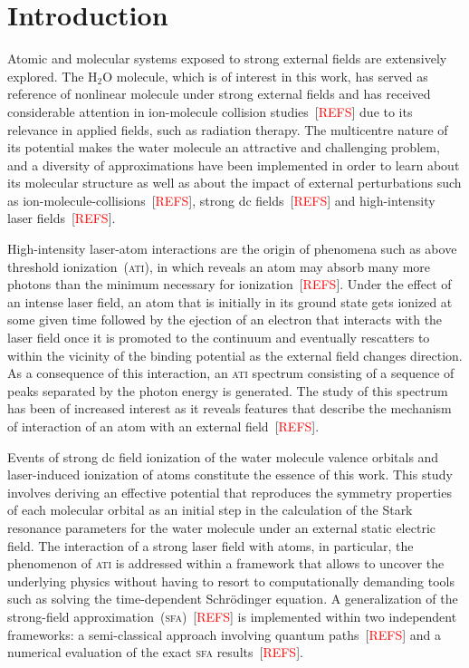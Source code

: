 \chapter{Introduction}
\label{cha:introduction}


Atomic and molecular systems exposed to strong external fields are
extensively explored. The H$_{2}$O molecule, which is of interest in
this work, has served as reference of nonlinear molecule under strong
external fields and has received considerable attention in
ion-molecule collision studies~[\textcolor{red}{REFS}] due to its
relevance in applied fields, such as radiation therapy.  The
multicentre nature of its potential makes the water molecule an
attractive and challenging problem, and a diversity of approximations
have been implemented in order to learn about its molecular structure
as well as about the impact of external perturbations such as
ion-molecule-collisions~[\textcolor{red}{REFS}], strong dc
fields~[\textcolor{red}{REFS}] and high-intensity laser
fields~[\textcolor{red}{REFS}].

High-intensity laser-atom interactions are the origin of phenomena
such as above threshold ionization~(\textsc{ati}), in which reveals an
atom may absorb many more photons than the minimum necessary for
ionization~[\textcolor{red}{REFS}].
Under the effect of an intense laser field, an atom that is initially
in its ground state gets ionized at some given time followed by the
ejection of an electron that interacts with the laser field once it is
promoted to the continuum and eventually rescatters to within the
vicinity of the binding potential as the external field changes
direction. As a consequence of this interaction, an \textsc{ati}
spectrum consisting of a sequence of peaks separated by the photon
energy is generated. The study of this spectrum has been of increased
interest as it reveals features that describe the mechanism of
interaction of an atom with an external field~[\textcolor{red}{REFS}].

Events of strong dc field ionization of the water molecule valence
orbitals and laser-induced ionization of atoms constitute the essence
of this work. This study involves deriving an effective potential that
reproduces the symmetry properties of each molecular orbital as an
initial step in the calculation of the Stark resonance parameters for
the water molecule under an external static electric field.
The interaction of a strong laser field with atoms, in particular, the
phenomenon of \textsc{ati} is addressed within a framework that allows
to uncover the underlying physics without having to resort to
computationally demanding tools such as solving the time-dependent
Schr\"{o}dinger equation. A generalization of the strong-field
approximation~(\textsc{sfa})~[\textcolor{red}{REFS}] is implemented
within two independent frameworks: a semi-classical approach involving
quantum paths~[\textcolor{red}{REFS}] and a numerical evaluation of
the exact \textsc{sfa} results~[\textcolor{red}{REFS}].


